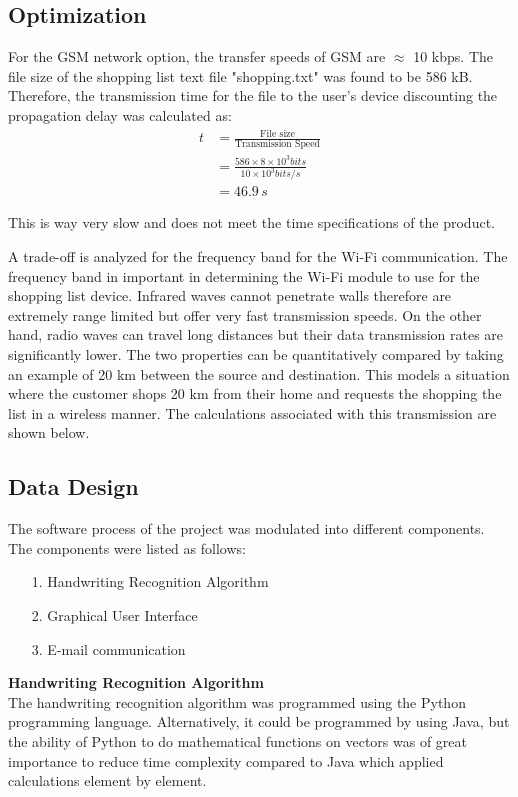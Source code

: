 \subsection{Optimization}
For the GSM network option, the transfer speeds of GSM are $\approx$ 10 kbps. The file size of the shopping list text file "shopping.txt" was found to be 586 kB. Therefore, the transmission time for the file to the user's device discounting the propagation delay was calculated as:
\begin{align*}
	t &= \frac{\text{File size}}{\text{Transmission Speed}}\\
	&= \frac{586 \times 8 \times 10^3 bits}{10 \times 10^3 bits/s}\\
	&= 46.9\,s
\end{align*}

This is way very slow and does not meet the time specifications of the product.

A trade-off is analyzed for the frequency band for the Wi-Fi communication. The frequency band in important in determining the Wi-Fi module to use for the shopping list device. Infrared waves cannot penetrate walls therefore are extremely range limited but offer very fast transmission speeds. On the other hand, radio waves can travel long distances but their data transmission rates are significantly lower. The two properties can be quantitatively compared by taking an example of 20 km between the source and destination. This models a situation where the customer shops 20 km from their home and requests the shopping the list in a wireless manner. The calculations associated with this transmission are shown below.\\
\newpage
\subsection{Data Design}
The software process of the project was modulated into different components. The components were listed as follows:
\begin{itemize}
	\item[1.]	Handwriting Recognition Algorithm
	\item[2.]	Graphical User Interface
	\item[3.]	E-mail communication
\end{itemize}

\textbf{Handwriting Recognition Algorithm}\\
The handwriting recognition algorithm was programmed using the Python programming language. Alternatively, it could be programmed by using Java, but the ability of Python to do mathematical functions on vectors was of great importance to reduce time complexity compared to Java which applied calculations element by element.


